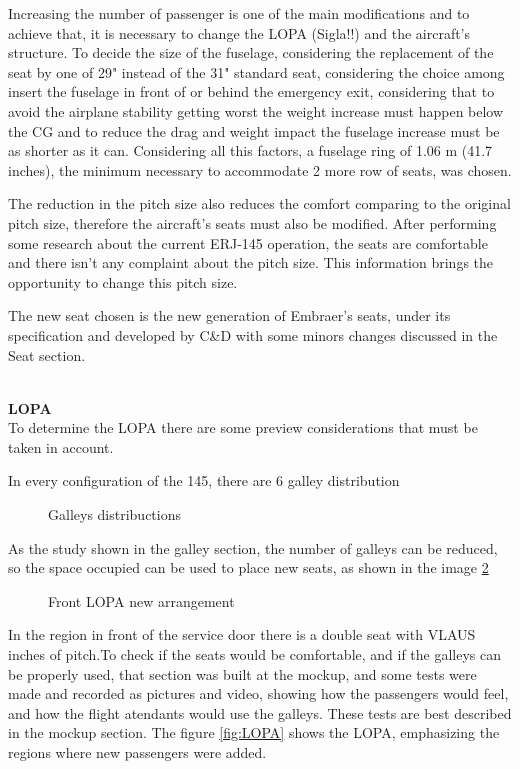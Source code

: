 ﻿%
Increasing the number of passenger is one of the main modifications and to achieve that, it is necessary to change the LOPA (Sigla!!) and the aircraft's structure. To decide the size of the fuselage, considering the replacement of the seat by one of 29" instead of the 31" standard seat, considering the choice among insert the fuselage in front of or behind the emergency exit, considering that to avoid the airplane stability getting worst the weight increase must happen below the CG and to reduce the drag and weight impact the fuselage increase must be as shorter as it can. Considering all this factors, a fuselage ring of 1.06 m (41.7 inches), the minimum necessary to accommodate 2 more row of seats, was chosen.


The reduction in the pitch size also reduces the comfort comparing to the original pitch size, therefore the aircraft's seats must also be modified. After performing some research about the current ERJ-145 operation, the seats are comfortable and there isn't any complaint about the pitch size. This information brings the opportunity to change this pitch size.

The new seat chosen is the new generation of Embraer's seats, under its specification and developed by C\&D with some minors changes discussed in the Seat section.\cite{SlimSeat}

\\
\textbf{LOPA}
\\

To determine the LOPA there are some preview considerations that must be taken in account.

In every configuration of the 145, there are 6 galley distribution
\begin{figure}[H] %
\caption{Galleys distribuctions}
\label{fig:galleysdistribuction}
\end{figure}

As the study shown in the galley section, the number of galleys can be reduced, so the space occupied can be used to place new seats, as shown in the image \ref{fig:frontlopa}


\begin{figure}[H] %
\caption{Front LOPA new arrangement}
\label{fig:frontlopa}
\end{figure}

In the region in front of the service door there is a double seat with VLAUS inches of pitch.To check if the seats would be comfortable, and if the galleys can be properly used, that section was built at the mockup, and some tests were made and recorded as pictures and video, showing how the passengers would feel, and how the flight atendants would use the galleys. These tests are best described in the mockup section.
The figure \ref{fig:LOPA} shows the LOPA, emphasizing the regions where new passengers were added.

